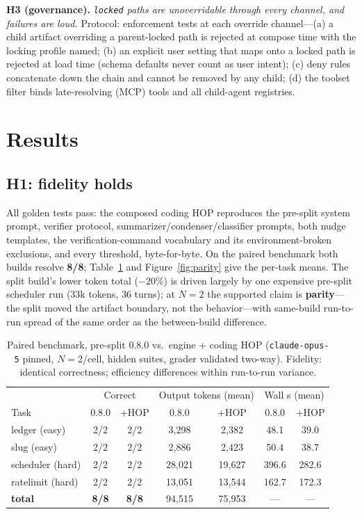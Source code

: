 \documentclass[10pt]{article}
\begin{document}
\textbf{H3 (governance).} \emph{\texttt{locked} paths are unoverridable through every channel, and
failures are loud.} Protocol: enforcement tests at each override channel---(a) a child artifact
overriding a parent-locked path is rejected at compose time with the locking profile named; (b) an
explicit user setting that maps onto a locked path is rejected at load time (schema defaults never
count as user intent); (c) deny rules concatenate down the chain and cannot be removed by any child;
(d) the toolset filter binds late-resolving (MCP) tools and all child-agent registries.

\section{Results}

\subsection{H1: fidelity holds}

All golden tests pass: the composed coding HOP reproduces the pre-split system prompt, verifier
protocol, summarizer/condenser/classifier prompts, both nudge templates, the verification-command
vocabulary and its environment-broken exclusions, and every threshold, byte-for-byte. On the paired
benchmark both builds resolve \textbf{8/8}; Table~\ref{tab:parity} and Figure~\ref{fig:parity} give the
per-task means. The split build's lower token total ($-20\%$) is driven largely by one expensive
pre-split scheduler run (33k tokens, 36 turns); at $N{=}2$ the supported claim is \textbf{parity}---the
split moved the artifact boundary, not the behavior---with same-build run-to-run spread of the same
order as the between-build difference.

\begin{table}[h]
\centering\small
\begin{tabular}{lcccccc}
\toprule
 & \multicolumn{2}{c}{Correct} & \multicolumn{2}{c}{Output tokens (mean)} & \multicolumn{2}{c}{Wall s (mean)} \\
Task & 0.8.0 & +HOP & 0.8.0 & +HOP & 0.8.0 & +HOP \\
\midrule
ledger (easy) & 2/2 & 2/2 & 3{,}298 & 2{,}382 & 48.1 & 39.0 \\
slug (easy) & 2/2 & 2/2 & 2{,}886 & 2{,}423 & 50.4 & 38.7 \\
scheduler (hard) & 2/2 & 2/2 & 28{,}021 & 19{,}627 & 396.6 & 282.6 \\
ratelimit (hard) & 2/2 & 2/2 & 13{,}051 & 13{,}544 & 162.7 & 172.3 \\
\midrule
\textbf{total} & \textbf{8/8} & \textbf{8/8} & 94{,}515 & 75{,}953 & --- & --- \\
\bottomrule
\end{tabular}
\caption{Paired benchmark, pre-split 0.8.0 vs.\ engine + coding HOP (\texttt{claude-opus-5} pinned,
$N{=}2$/cell, hidden suites, grader validated two-way). Fidelity: identical correctness; efficiency
differences within run-to-run variance.}
\label{tab:parity}
\end{table}
\end{document}

